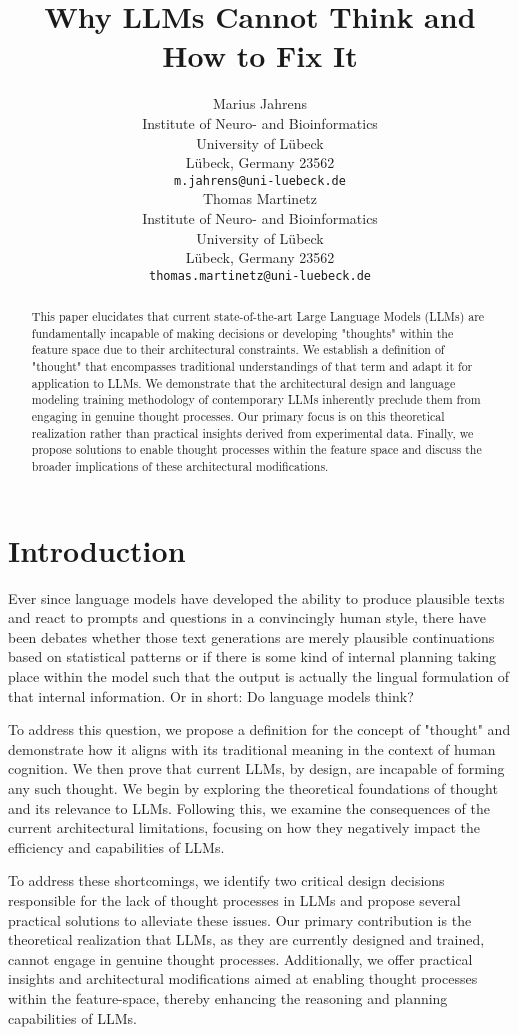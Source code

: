 \documentclass{article}
\title{Why LLMs Cannot Think and How to Fix It}
\author{%
  Marius Jahrens \\
  Institute of Neuro- and Bioinformatics\\
  University of Lübeck\\
  Lübeck, Germany 23562 \\
  \texttt{m.jahrens@uni-luebeck.de} \\
  \And
  Thomas Martinetz \\
  Institute of Neuro- and Bioinformatics\\
  University of Lübeck\\
  Lübeck, Germany 23562 \\
  \texttt{thomas.martinetz@uni-luebeck.de} \\
}
\begin{document}
\maketitle

\begin{abstract}
  This paper elucidates that current state-of-the-art Large Language Models (LLMs) are fundamentally incapable of making decisions or developing "thoughts" within the feature space due to their architectural constraints. We establish a definition of "thought" that encompasses traditional understandings of that term and adapt it for application to LLMs. We demonstrate that the architectural design and language modeling training methodology of contemporary LLMs inherently preclude them from engaging in genuine thought processes. Our primary focus is on this theoretical realization rather than practical insights derived from experimental data. Finally, we propose solutions to enable thought processes within the feature space and discuss the broader implications of these architectural modifications.
\end{abstract}

\section{Introduction}
Ever since language models have developed the ability to produce plausible texts and react to prompts and questions in a convincingly human style, there have been debates whether those text generations are merely plausible continuations based on statistical patterns or if there is some kind of internal planning taking place within the model such that the output is actually the lingual formulation of that internal information. 
Or in short: Do language models think?

To address this question, we propose a definition for the concept of "thought" and demonstrate how it aligns with its traditional meaning in the context of human cognition. We then prove that current LLMs, by design, are incapable of forming any such thought.
We begin by exploring the theoretical foundations of thought and its relevance to LLMs. Following this, we examine the consequences of the current architectural limitations, focusing on how they negatively impact the efficiency and capabilities of LLMs. 

To address these shortcomings, we identify two critical design decisions responsible for the lack of thought processes in LLMs and propose several practical solutions to alleviate these issues. Our primary contribution is the theoretical realization that LLMs, as they are currently designed and trained, cannot engage in genuine thought processes.
Additionally, we offer practical insights and architectural modifications aimed at enabling thought processes within the feature-space, thereby enhancing the reasoning and planning capabilities of LLMs.
\end{document}
